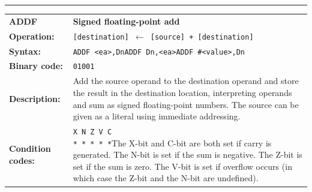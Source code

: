 \documentclass[]{article}
\begin{document}
\begin{appendices}
\noindent\rule{10cm}{1pt}\newline %
\setlength\extrarowheight{5pt} %
\begin{tabularx}{\textwidth}{lL}
  {\Large \textbf{ADDF}} 	& {\Large \textbf{Signed floating-point add}}\\
  \textbf{Operation:} 		& \texttt{[destination] $\leftarrow$ [source] + [destination]}\\
  \textbf{Syntax:}  		& \texttt{ADDF <ea>,Dn}\newline\texttt{ADDF Dn,<ea>}\newline\texttt{ADDF \#<value>,Dn}\\
  \textbf{Binary code:} 	& \texttt{01001}\\
  \textbf{Description:}  	& Add the source operand to the destination operand and store the
result in the destination location, interpreting operands and sum as signed floating-point numbers. The source can be given as a literal using immediate addressing.\\
  \textbf{Condition codes:} & \texttt{X N Z V C\newline * * * * *}\newline\newline The X-bit and C-bit are both set if carry is generated. The N-bit is set if the sum is negative. The Z-bit is set if the sum is zero. The V-bit is set if overflow occurs (in which case the Z-bit and the N-bit are undefined).\\
\end{tabularx}
\newline

\newpage


\end{appendices}
\end{document}
